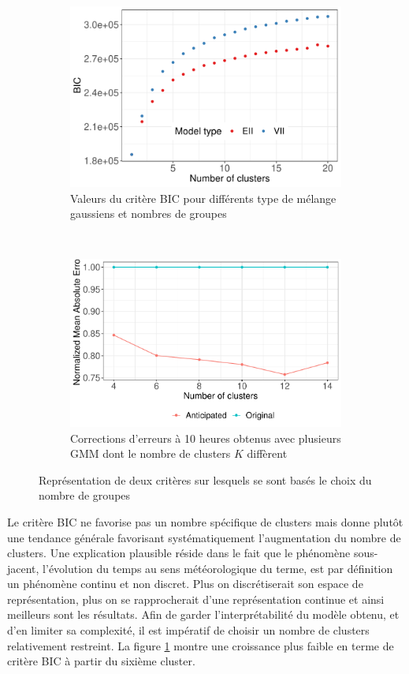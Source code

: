 \documentclass[12pt, french]{report}
\begin{document}
\begin{figure}[htbp]
	\begin{subfigure}{0.5\linewidth}
		\centering
		\includegraphics[width = 0.9 \linewidth]{Images/PV/GMM/GMM_BICCompare_20.pdf}
		\caption{Valeurs du critère BIC pour différents type de mélange gaussiens et nombres de groupes}
		\label{fig:PV_GMM_BIC}
	\end{subfigure}
	~
	\begin{subfigure}{0.5\linewidth}
		\centering
		\includegraphics[width = 0.9 \linewidth]{Images/PV/GMM/GMM_CompareIntraday.pdf}
		\caption{Corrections d'erreurs à 10 heures obtenus avec plusieurs GMM dont le nombre de clusters $K$ diffèrent}
		\label{fig:PV_GMM_IntradayComp}
	\end{subfigure}
	\caption{Représentation de deux critères sur lesquels se sont basés le choix du nombre de groupes}
\end{figure}

Le critère BIC ne favorise pas un nombre spécifique de clusters mais donne plutôt une tendance générale favorisant systématiquement l'augmentation du nombre de clusters. Une explication plausible réside dans le fait que le phénomène sous-jacent, l'évolution du temps au sens météorologique du terme, est par définition un phénomène continu et non discret. Plus on discrétiserait son espace de représentation, plus on se rapprocherait d'une représentation continue et ainsi meilleurs sont les résultats. Afin de garder l'interprétabilité du modèle obtenu, et d'en limiter sa complexité, il est impératif de choisir un nombre de clusters relativement restreint. La figure \ref{fig:PV_GMM_BIC} montre une croissance plus faible en terme de critère BIC à partir du sixième cluster.
\end{document}
